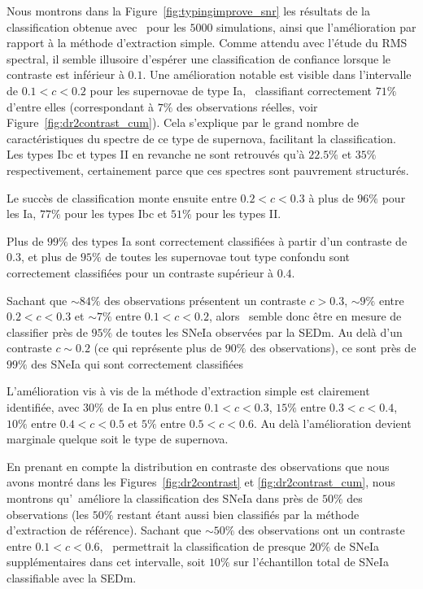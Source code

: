 \documentclass[../main/main.tex]{subfiles}
\begin{document}
Nous montrons dans la Figure~\ref{fig:typingimprove_snr} les résultats
de la classification obtenue avec \hypergal\ pour les $5000$
simulations, ainsi que l'amélioration par rapport à la méthode
d'extraction simple. Comme attendu avec l'étude du RMS spectral, il
semble illusoire d'espérer une classification de confiance lorsque le
contraste est inférieur à $0.1$. Une amélioration notable est visible dans
l'intervalle de $0.1<c<0.2$ pour les supernovae de type Ia,
\hypergal\ classifiant correctement $71\%$ d'entre elles (correspondant
à $7\%$ des observations réelles, voir Figure~\ref{fig:dr2contrast_cum}). Cela
s'explique par le grand nombre de caractéristiques du spectre de ce type
de supernova, facilitant la classification. Les types Ibc et types II en
revanche ne sont retrouvés qu'à $22.5\%$ et $35\%$ respectivement, certainement parce que
ces spectres sont pauvrement structurés. 

Le succès de classification monte ensuite entre $0.2<c<0.3$ à plus de
$96\%$ pour les Ia, $77\%$ pour les types  Ibc et $51\%$ pour les types II.

Plus de $99\%$ des types Ia sont correctement classifiées à partir d'un
contraste de $0.3$, et plus de $95\%$ de toutes les supernovae tout type
confondu sont
correctement classifiées pour un contraste supérieur à $0.4$.

Sachant que $\sim84\%$ des observations présentent un contraste $c>0.3$,
$\sim9\%$ entre $0.2<c<0.3$ et $\sim7\%$ entre $0.1<c<0.2$, alors \hypergal\ semble donc être en mesure de classifier près de $95\%$ de
toutes les SNeIa observées par la SEDm. Au delà d'un
contraste $c\sim0.2$ (ce qui représente plus de $90\%$ des observations), ce sont près de $99\%$ des SNeIa qui sont
correctement classifiées

L'amélioration vis à vis de la méthode d'extraction simple est
clairement identifiée, avec $30\%$ de Ia en plus entre $0.1<c<0.3$,
$15\%$ entre $0.3<c<0.4$, $10\%$ entre $0.4<c<0.5$ et
$5\%$ entre $0.5<c<0.6$. Au delà l'amélioration devient marginale quelque
soit le type de supernova.

En prenant en compte la distribution en contraste des observations que
nous avons montré dans les Figures~\ref{fig:dr2contrast} et
\ref{fig:dr2contrast_cum}, nous montrons qu'\hypergal\ améliore la
classification des SNeIa dans près de $50\%$ des observations (les
$50\%$ restant étant aussi bien classifiés par la méthode d'extraction
de référence). Sachant que $\sim50\%$ des observations ont un contraste
entre $0.1<c<0.6$, \hypergal\ permettrait la classification de presque
$20\%$ de SNeIa supplémentaires dans cet intervalle, soit $10\%$ sur
l'échantillon total de SNeIa classifiable avec la SEDm. 
\end{document}
